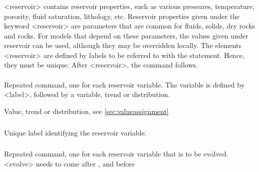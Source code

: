 {\subsubsection{}
 \slist
   \item \Description <reservoir> contains reservoir properties, such as various pressures, temperature, porosity, fluid saturation, lithology, etc. Reservoir properties given under the keyword <reservoir> are parameters that are common for fluids, solids, dry rocks and rocks. For models that depend on these parameters, the values given under reservoir can be used, although they may be overridden locally. The elements <reservoir> are defined by labels to be referred to with the  statement. Hence, they must be unique. After <reservoir>, the command  follows.
   \item \Argument 
   \item \Default 
 \elist

\paragraph{}
 \slist
   \item \Description Repeated command, one for each reservoir variable. The variable is defined by <label>, followed by a variable, trend or distribution. 
   \item \Argument Value, trend or distribution, see \autoref{sec:valueassignment}
   \item \Default 
 \elist

\subparagraph{}
 \slist
   \item \Description Unique label identifying the reservoir variable. 
   \item \Argument
   \item \Default 
 \elist

\subsubsection{}
 \slist
   \item \Description Repeated command, one for each reservoir variable that is to be evolved. <evolve> needs to come after , and before 
   \item \Argument 
   \item \Default 
 \elist

}
